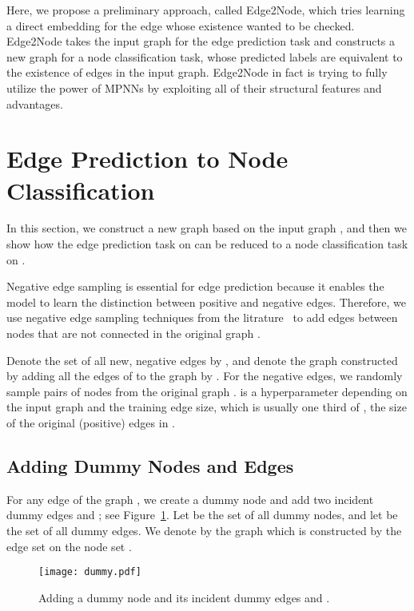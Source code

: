 \documentclass{article}
\begin{document}
Here, we propose a preliminary approach, called Edge2Node, which tries learning a direct embedding for the edge whose existence wanted to be checked. Edge2Node takes the input graph for the edge prediction task and constructs a new graph for a node classification task, whose predicted labels are equivalent to the existence of edges in the input graph. Edge2Node in fact is trying to fully utilize the power of MPNNs by exploiting all of their structural features and advantages.






\section{Edge Prediction to Node Classification}
\label{sec:headings}
In this section, we construct a new graph  based on the input graph , and then we show how the edge prediction task on  can be reduced to a node classification task on . 

Negative edge sampling is essential for edge prediction because it enables the model to learn the distinction between positive and negative edges. Therefore, we use negative edge sampling techniques from the litrature~\cite{perozzi2014deepwalk,grover2016node2vec,yang2020understanding} to add edges between nodes that are not connected in the original graph . 

Denote the set of all new, negative edges by , and denote the graph constructed by adding all the edges of  to the graph  by . For the negative edges, we randomly sample  pairs of nodes from the original graph .  is a hyperparameter depending on the input graph and the training edge size, which is usually one third of , the size of the original (positive) edges in .



\subsection{Adding Dummy Nodes and Edges}
For any edge  of the graph  , we create a  dummy node  and add two incident dummy edges  and ; see Figure~\ref{fig:dummy}. Let  be the set of all dummy nodes, and let  be the set of all  dummy edges. 
We denote by  the graph which is constructed by the edge set  on the node set .


	\begin{figure}[h!]
	\centering
	\texttt{[image: dummy.pdf]}
	\caption{Adding a dummy node  and its incident dummy edges  and .}
 \label{fig:dummy}
	\end{figure}
\end{document}
